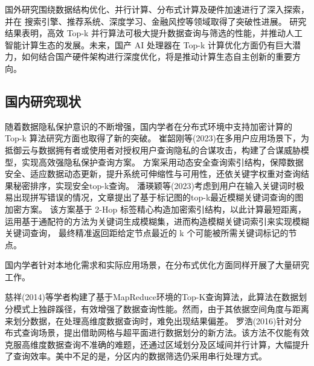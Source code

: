 国外研究围绕数据结构优化、并行计算、分布式计算及硬件加速进行了深入探索，并在 搜索引擎、推荐系统、深度学习、金融风控等领域取得了突破性进展。
研究结果表明，高效 Top-k 并行算法可极大提升数据查询与筛选的性能，并推动人工智能计算生态的发展。未来，国产 AI 处理器在 Top-k 计算优化方面仍有巨大潜力，如何结合国产硬件架构进行深度优化，将是推动计算生态自主创新的重要方向。



\subsection{国内研究现状}

随着数据隐私保护意识的不断增强，国内学者在分布式环境中支持加密计算的 Top-k 算法研究方面也取得了新的突破。
崔韶刚等(2023)在多用户应用场景下，为抵御云与数据拥有者或使用者对授权用户查询隐私的合谋攻击，构建了合谋威胁模型，实现高效强隐私保护查询方案。
方案采用动态安全查询索引结构，保障数据安全、适应数据动态更新，提升系统可伸缩性与可用性，还依关键字权重对查询结果秘密排序，实现安全top-k查询。
潘瑛颖等(2023)考虑到用户在输入关键词时极易出现拼写错误的情况，文章提出了基于标记图的top-k最近模糊关键词查询的图加密方案\cite{WXHK202311043}。
该方案基于 2-Hop 标签精心构造加密索引结构，以此计算最短距离，运用基于通配符的方法为关键词生成模糊集，进而构造模糊关键词索引来实现模糊关键词查询，
最终精准返回距给定节点最近的 k 个可能被所需关键词标记的节点。

国内学者针对本地化需求和实际应用场景，在分布式优化方面同样开展了大量研究工作。

慈祥(2014)等学者构建了基于MapReduce环境的Top-K查询算法，此算法在数据划分模式上独辟蹊径，有效增强了数据查询性能\cite{RJXB201404009}。然而，由于其依据空间角度与距离来划分数据，在处理高维度数据查询时，难免出现结果偏差。
罗浩(2016)针对分布式查询场景，提出借助网格与超平面进行数据划分的新方法\cite{1016325208.nh}。该方法不仅能有效克服高维度数据查询不准确的难题，还通过区域划分及区域间并行计算，大幅提升了查询效率。美中不足的是，分区内的数据筛选仍采用串行处理方式。 


